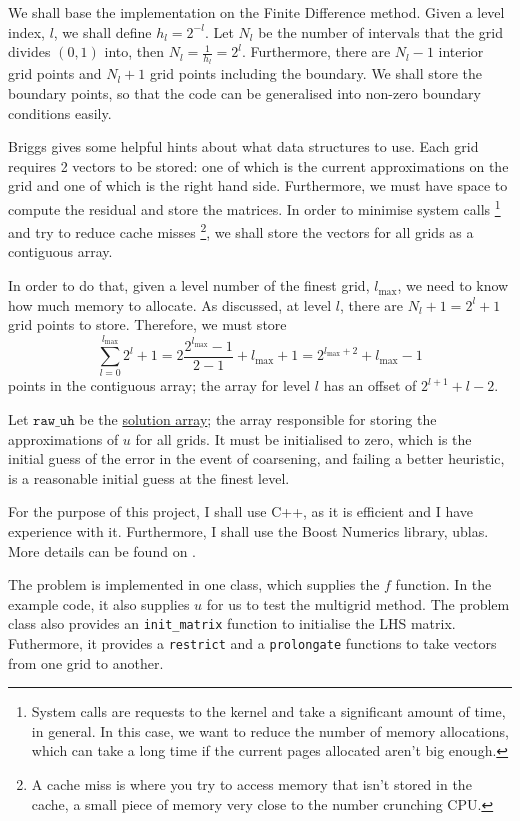 \documentclass[a4paper,10pt,oneside]{book}
\theoremstyle{plain}%
\theoremstyle{definition}
\theoremstyle{remark}
\begin{document}
We shall base the implementation on the Finite Difference method. Given a level
index, $l$, we shall define $h_l=2^{-l}$. Let $N_l$ be the number of intervals
that the grid divides $(0,1)$ into, then $N_l=\frac{1}{h_l}=2^l$.
Furthermore, there are $N_l-1$ interior grid points and $N_l+1$ grid points
including the boundary. We shall store the boundary points, so that the code
can be generalised into non-zero boundary conditions easily.

Briggs \cite{Briggs87} gives some helpful hints about what data structures to
use. Each grid requires 2 vectors to be stored: one of which is the current
approximations on the grid and one of which is the right hand side.
Furthermore, we must have space to compute the residual and store the matrices.
In order to minimise system calls \footnote{System calls are requests to the
kernel and take a significant amount of time, in general. In this case, we want
to reduce the number of memory allocations, which can take a long time if the
current pages allocated aren't big enough.} and try to reduce cache misses
\footnote{A cache miss is where you try to access memory that isn't stored in
the cache, a small piece of memory very close to the number crunching CPU.}, we
shall store the vectors for all grids as a contiguous array.

In order to do
that, given a level number of the finest grid, $l_{\max}$, we need to know how
much memory to allocate. As discussed, at level $l$, there are $N_l+1=2^l+1$
grid points to store. Therefore, we must store
\begin{equation}
 \sum_{l=0}^{l_{\max}}2^l+1
  =2\frac{2^{l_{\max}}-1}{2-1}+l_{\max}+1
  =2^{l_{\max}+2}+l_{\max}-1
\end{equation}
points in the contiguous array; the array for level $l$ has an offset of
$2^{l+1}+l-2$.

Let $\mathtt{raw\_uh}$ be the \underline{solution array}; the array responsible
for storing the approximations of $u$ for all grids. It must be initialised to
zero, which is the initial guess of the error in the event of coarsening, and
failing a better heuristic, is a reasonable initial guess at the finest level.

For the purpose of this project, I shall use C++, as it is efficient and I have
experience with it. Furthermore, I shall use the Boost Numerics library, ublas.
More details can be found on \cite{Boost}.

The problem is implemented in one class, which supplies the $f$ function. In
the example code, it also supplies $u$ for us to test the multigrid method. The
problem class also provides an \texttt{init\_matrix} function to initialise the
LHS matrix. Futhermore, it provides a \texttt{restrict} and a
\texttt{prolongate} functions to take vectors from one grid to another.
\end{document}
